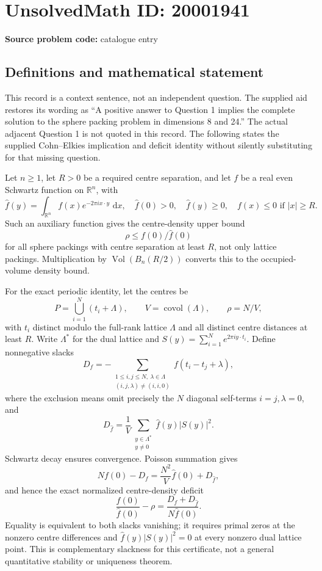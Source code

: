 \documentclass[11pt]{article}
\newcommand{\R}{\mathbb{R}}
\newcommand{\dd}{\,\mathrm{d}}
\begin{document}
\section*{UnsolvedMath ID: 20001941}
\textbf{Source problem code:} catalogue entry
\subsection{Definitions and mathematical statement}
This record is a context sentence, not an independent question. The supplied aid restores its wording as ``A positive answer to Question 1 implies the complete solution to the sphere packing problem in dimensions 8 and 24.'' The actual adjacent Question 1 is not quoted in this record. The following states the supplied Cohn--Elkies implication and deficit identity without silently substituting for that missing question.

Let \(n\geq1\), let \(R>0\) be a required centre separation, and let \(f\) be a real even Schwartz function on \(\R^n\), with
\[
 \widehat f(y)=\int_{\R^n}f(x)e^{-2\pi i x\cdot y}\,\dd x,
 \quad \widehat f(0)>0,\quad \widehat f(y)\geq0,
 \quad f(x)\leq0\text{ if }|x|\geq R.
\]
Such an auxiliary function gives the centre-density upper bound
\[
 \rho\leq f(0)/\widehat f(0)
\]
for all sphere packings with centre separation at least \(R\), not only lattice packings. Multiplication by \(\operatorname{Vol}(B_n(R/2))\) converts this to the occupied-volume density bound.

For the exact periodic identity, let the centres be
\[
 P=\bigcup_{i=1}^N(t_i+\Lambda),\qquad
 V=\operatorname{covol}(\Lambda),\qquad \rho=N/V,
\]
with \(t_i\) distinct modulo the full-rank lattice \(\Lambda\) and all distinct centre distances at least \(R\). Write \(\Lambda^*\) for the dual lattice and
\(S(y)=\sum_{i=1}^Ne^{2\pi i y\cdot t_i}\). Define nonnegative slacks
\[
 D_f=-\sum_{\substack{1\leq i,j\leq N,\ \lambda\in\Lambda\\
                   (i,j,\lambda)\ne(i,i,0)}}
                  f(t_i-t_j+\lambda),
\]
where the exclusion means omit precisely the \(N\) diagonal self-terms \(i=j,\lambda=0\), and
\[
 D_{\widehat f}=\frac1V\sum_{\substack{y\in\Lambda^*\\y\ne0}}
                     \widehat f(y)|S(y)|^2.
\]
Schwartz decay ensures convergence. Poisson summation gives
\[
 Nf(0)-D_f=\frac{N^2}{V}\widehat f(0)+D_{\widehat f},
\]
and hence the exact normalized centre-density deficit
\[
 \frac{f(0)}{\widehat f(0)}-\rho
 =\frac{D_f+D_{\widehat f}}{N\widehat f(0)}.
\]
Equality is equivalent to both slacks vanishing; it requires primal zeros at the nonzero centre differences and \(\widehat f(y)|S(y)|^2=0\) at every nonzero dual lattice point. This is complementary slackness for this certificate, not a general quantitative stability or uniqueness theorem.
\end{document}
